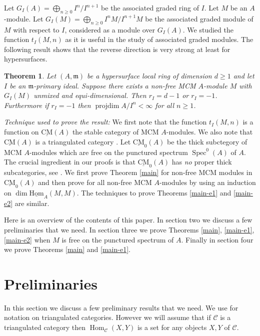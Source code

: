 \documentclass{amsart}
\newcommand{\m}{\mathfrak{m} }
\newcommand{\projdim}{\operatorname{projdim}}
\newcommand{\Spec}{\operatorname{Spec}}
\newcommand{\CMS}{\operatorname{\underline{CM}}}
\newcommand{\Hom}{\operatorname{Hom}}
\newcommand{\sHom}{\operatorname{\underline{Hom}}}
\theoremstyle{plain}
\newtheorem{theorem}{Theorem}[section]
\theoremstyle{definition}
\theoremstyle{remark}
\begin{document}
\s Let $G_I(A) = \bigoplus_{n \geq 0}I^n/I^{n+1}$ be the associated graded ring of $I$. Let $M$ be an $A$-module. Let $G_I(M) = \bigoplus_{n \geq 0}I^nM/I^{n+1}M$ be the associated graded module of $M$ with respect to $I$, considered as a module over $G_I(A)$. We studied the function $t_I(M, n)$ as it is useful in the study of associated graded modules. The following result shows that the reverse direction is very strong at least for hypersurfaces.
\begin{theorem}
\label{ass} Let $(A,\m)$ be a hypersurface local ring of dimension $d \geq 1$ and let $I$ be an $\m$-primary ideal. Suppose there exists a non-free MCM $A$-module $M$ with $G_I(M)$ unmixed and equi-dimensional. Then $r_I = d -1$ or $r_I = -1$. Furthermore if $r_I = -1$ then $\projdim A/I^n < \infty$ for all $n \geq 1$.
\end{theorem}
\emph{Technique used to prove the result:} We first note that the function $t_I(M,n)$ is a function on $\CMS(A)$ the stable category of MCM $A$-modules. We also note that $\CMS(A)$ is a triangulated category \cite[4.4.1]{Buchw}. Let $\CMS_0(A)$ be the thick subctegory of MCM $A$-modules which are free on the punctured spectrum $\Spec^0(A)$ of $A$. The crucial ingredient in our proofs is that $\CMS_0(A)$ has \emph{no} proper thick subcategories, see \cite[6.6]{T}. We first prove Theorem \ref{main} for non-free MCM modules in $\CMS_0(A)$ and then prove for all non-free MCM $A$-modules by using an induction on $\dim \sHom_A(M, M)$. The techniques to prove Theorems \ref{main-e1} and  \ref{main-e2} are similar.

Here is an overview of the contents of this paper. In section two we discuss a few preliminaries that we need.
In section three we prove Theorems \ref{main}, \ref{main-e1}, \ref{main-e2} when $M$ is free on the punctured spectrum of $A$. Finally in section four we prove Theorems \ref{main} and \ref{main-e1}.

\section{Preliminaries}
In this section we discuss a few preliminary results that we need.
We use \cite{N} for notation on triangulated categories. However we will assume that if $\mathcal{C}$ is a triangulated category then $\Hom_\mathcal{C}(X, Y)$ is a set for any objects $X, Y$ of $\mathcal{C}$.
\end{document}
